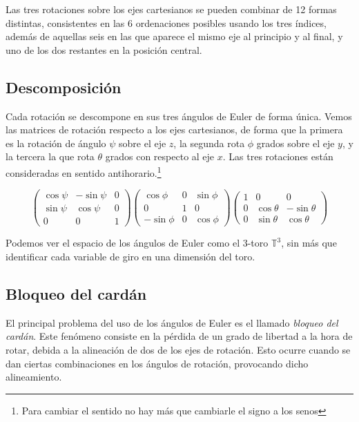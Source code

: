 \documentclass{article}
\theoremstyle{plain}
\theoremstyle{definition}
\theoremstyle{remark}
\begin{document}
Las tres rotaciones sobre los ejes cartesianos se pueden combinar de 12 formas distintas, consistentes en
las 6 ordenaciones posibles usando los tres índices, además de aquellas seis en las que aparece el mismo
eje al principio y al final, y uno de los dos restantes en la posición central.


\subsection{Descomposición}
Cada rotación se descompone en sus tres ángulos de Euler de forma única. Vemos las matrices de rotación
respecto a los ejes cartesianos, de forma que la primera es la rotación de ángulo $\psi$ sobre el
eje $z$, la segunda rota $\phi$ grados sobre el eje $y$, y la tercera la que rota $\theta$ grados con respecto
al eje $x$. Las tres rotaciones están consideradas en sentido antihorario.\footnote{Para cambiar el sentido no hay más que cambiarle el signo a los senos}

\[\begin{pmatrix}
    \cos \psi & -\sin \psi & 0 \\
    \sin \psi & \cos \psi & 0 \\
    0 & 0 & 1
  \end{pmatrix}\begin{pmatrix}
      \cos \phi & 0 & \sin \phi \\
      0 & 1 & 0 \\
      -\sin \phi & 0 & \cos \phi
    \end{pmatrix}\begin{pmatrix}
    1 & 0 & 0 \\
    0 & \cos \theta & -\sin \theta \\
    0 & \sin \theta & \cos \theta
  \end{pmatrix}
\]

Podemos ver el espacio de los ángulos de Euler como el 3-toro $\mathbb T^3$, sin más que identificar cada variable de giro
en una dimensión del toro.


\subsection{Bloqueo del cardán}

El principal problema del uso de los ángulos de Euler es el llamado \textit{bloqueo del cardán}. Este fenómeno
consiste en la pérdida de un grado de libertad a la hora de rotar, debida a la alineación de dos de los ejes
de rotación. Esto ocurre cuando se dan ciertas combinaciones en los ángulos de rotación, provocando dicho alineamiento.
\end{document}
